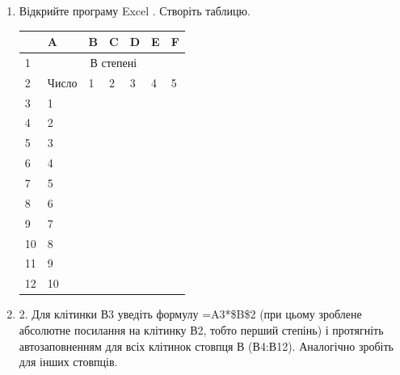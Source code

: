 \documentclass{article}
\begin{document}
	\begin{enumerate}
		\item Відкрийте програму Excel . Створіть таблицю.
		\begin{center}
			\begin{tabular}{|p{} | p{0.1\textwidth}|p{}|p{}|p{}|p{}|p{}|}
				\hline
				 & A & B & C & D & E & F \\ 
				\hline
				1 & \multicolumn{6}{|c|}{В степені} \\
				\hline
				2 & Число & 1 & 2 & 3 & 4 & 5 \\
				\hline
				3 & 1 &  &  &  &  &  \\
				\hline
				4 & 2 &  &  &  &  &  \\
				\hline
				5 & 3 &  &  &  &  &  \\
				\hline
				6 & 4 &  &  &  &  &  \\
				\hline
				7 & 5 &  &  &  &  &  \\
				\hline
				8 & 6 &  &  &  &  &  \\
				\hline
				9 & 7 &  &  &  &  &  \\
				\hline
				10 & 8 &  &  &  &  &  \\
				\hline
				11 & 9 &  &  &  &  &  \\
				\hline
				12 & 10 &  &  &  &  &  \\
				\hline
			\end{tabular}
		\end{center}
		\item 2.	Для клітинки В3 уведіть формулу =A3*\$B\$2 (при цьому зроблене абсолютне посилання на клітинку В2, тобто перший степінь) і протягніть автозаповненням для всіх клітинок стовпця В (В4:В12). Аналогічно зробіть для інших стовпців.
		

\end{enumerate}
\end{document}
